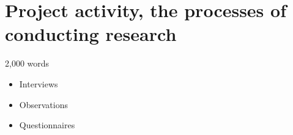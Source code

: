 \section{Project activity, the processes of conducting research}
2,000 words 

\begin{itemize}
\item Interviews
\item Observations
\item Questionnaires 
\end{itemize}